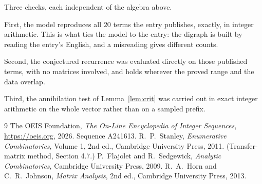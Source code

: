 \documentclass[11pt,a4paper]{article}
\theoremstyle{plain}
\theoremstyle{definition}
\begin{document}
Three checks, each independent of the algebra above.

First, the model reproduces all $20$ terms the entry publishes, exactly, in integer
arithmetic. This is what ties the model to the entry: the digraph is built by reading the
entry's English, and a misreading gives different counts.

Second, the conjectured recurrence was evaluated directly on those published terms, with no
matrices involved, and holds wherever the proved range and the data overlap.

Third, the annihilation test of Lemma~\ref{lem:crit} was carried out in exact integer
arithmetic on the whole vector rather than on a sampled prefix.

\begin{thebibliography}{9}
 The OEIS Foundation, \emph{The On-Line Encyclopedia of Integer
Sequences}, \url{https://oeis.org}, 2026. Sequence A241613.
 R.~P.~Stanley, \emph{Enumerative Combinatorics}, Volume 1, 2nd ed.,
Cambridge University Press, 2011. (Transfer-matrix method, Section 4.7.)
 P.~Flajolet and R.~Sedgewick, \emph{Analytic Combinatorics}, Cambridge
University Press, 2009.
 R.~A.~Horn and C.~R.~Johnson, \emph{Matrix Analysis}, 2nd ed., Cambridge
University Press, 2013.
\end{thebibliography}
\end{document}
